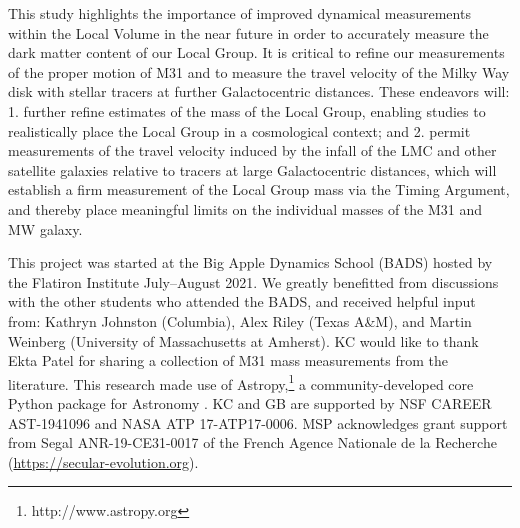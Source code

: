 \documentclass[twocolumn]{aastex631}
\begin{document}
This study highlights the importance of improved dynamical measurements within
the Local Volume in the near future in order to accurately measure the dark
matter content of our Local Group.
It is critical to refine our measurements of the proper motion of M31 and to
measure the travel velocity of the Milky Way disk with stellar tracers at
further Galactocentric distances.
These endeavors will: 1. further refine estimates of the mass of the Local
Group, enabling studies to realistically place the Local Group in a cosmological
context; and 2. permit measurements of the travel velocity induced by the infall
of the LMC and other satellite galaxies relative to tracers at large
Galactocentric distances, which will establish a firm measurement of the Local
Group mass via the Timing Argument, and thereby place meaningful limits on the
individual masses of the M31 and MW galaxy.


\begin{acknowledgements}

This project was started at the Big Apple Dynamics School (BADS) hosted by the
Flatiron Institute July--August 2021.
We greatly benefitted from discussions with the other students who attended the
BADS, and received helpful input from:
Kathryn Johnston (Columbia), Alex Riley (Texas A\&M), and Martin Weinberg
(University of Massachusetts at Amherst).
KC would like to thank Ekta Patel for sharing a collection of M31 mass
measurements from the literature.
This research made use of Astropy,\footnote{http://www.astropy.org} a
community-developed core Python package for Astronomy \citep{astropy:2013,
astropy:2018}.
KC and GB are supported by NSF CAREER AST-1941096 and NASA ATP 17-ATP17-0006.
MSP acknowledges grant support from Segal ANR-19-CE31-0017 of the French Agence
Nationale de la Recherche (\url{https://secular-evolution.org}).

\end{acknowledgements}

\end{document}
